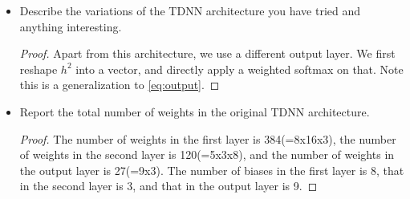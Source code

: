 \documentclass[11pt]{article}
\newcommand{\1}{\mathbf{1}}
\begin{document}
{\begin{itemize}
\begin{proof}
        We can achieve this architecture using the built-in convolutional network module from TensorFlow. Specific functions are as follow:
        \begin{itemize}
          \item Initialization of weight matrices through {\tt weight\_variable(shape)}, which uses {\tt tf.truncated\_normal} to randomly generated weight matrices.
          \item Initialization of bias vectors through {\tt bias\_variable(shape)}, which uses {\tt tf.constant} to generate bias vectors.
          \item Convolution layer through {\tt tf.nn.conv2d(z, W, stride=[1,1,1,1], padding=`VALID')} where we set the stride size to be 1, and the padding size to be `{\tt VALID}' meaning we do not pad zeros on the boundary. Note here:
          \begin{itemize}
          \item {\tt z} denotes for $h^0$, $h^1$, and $h^2$, and has to be reshaped into $[-1,T_l,1,J_l]$, where $T_l$ is the number of total frames, and $J_l$ is the number of units/channels in $l$-th layer.
          \item {\tt W} denotes the weight matrix associated with {\tt z}, and should be shaped as $[N_l+1, 1, J_l, J_{l+1}]$.
          \end{itemize}
          \item Activation layer though ReLU/Sigmoid by calling {\tt tf.nn.relu}/{\tt tf.sigmoid}.
          \item Softmax layer though {\tt tf.nn.softmax} as seen in HW1.
        \end{itemize}
      \end{proof}
  \item Describe the variations of the TDNN architecture you have tried and anything interesting.
  \begin{proof}
    Apart from this architecture, we use a different output layer. We first reshape $h^2$ into a vector, and directly apply a weighted softmax on that. Note this is a generalization to \eqref{eq:output}.
  \end{proof}
  \item Report the total number of weights in the original TDNN architecture.
  \begin{proof}
    The number of weights in the first layer is 384(=8x16x3), the number of weights in the second layer is 120(=5x3x8), and the number of weights in the output layer is 27(=9x3). The number of biases in the first layer is 8, that in the second layer is 3, and that in the output layer is 9.

\end{proof}
\end{itemize}}
\end{document}
